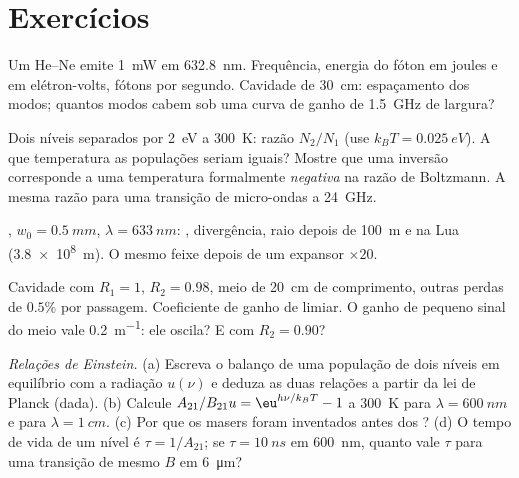 \section{Exercícios}

\begin{exercise}[$\star$]\label{exo:b2:laser:1}
Um  He--Ne emite \qty{1}{mW} em \qty{632.8}{nm}. Frequência, energia
do fóton em joules e em elétron-volts, fótons por segundo. Cavidade de
\qty{30}{cm}: espaçamento dos modos; quantos modos cabem sob uma curva de ganho
de \qty{1.5}{GHz} de largura?
\end{exercise}

\begin{exercise}[$\star$]\label{exo:b2:laser:2}
Dois níveis separados por \qty{2}{eV} a \qty{300}{K}: razão $N_2/N_1$ (use
$k_BT = \qty{0.025}{eV}$). A que temperatura as populações seriam
iguais? Mostre que uma inversão corresponde a uma temperatura formalmente \emph{negativa}
na razão de Boltzmann. A mesma razão para uma transição de micro-ondas
a \qty{24}{GHz}.
\end{exercise}

\begin{exercise}[$\star$]\label{exo:b2:laser:3}
, $w_0 = \qty{0.5}{mm}$, $\lambda = \qty{633}{nm}$: , divergência, raio depois de \qty{100}{m} e na Lua
(\qty{3.8e8}{m}). O mesmo feixe depois de um expansor $\times 20$.
\end{exercise}

\begin{exercise}[$\star$]\label{exo:b2:laser:4}
Cavidade com $R_1 = 1$, $R_2 = 0.98$, meio de \qty{20}{cm} de comprimento, outras
perdas de $0.5\%$ por passagem. Coeficiente de ganho de limiar. O ganho de
pequeno sinal do meio vale \qty{0.2}{m^{-1}}: ele oscila? E com
$R_2 = 0.90$?
\end{exercise}

\begin{exercise}[$\star\star$]\label{exo:b2:laser:5}
\emph{Relações de Einstein.} (a) Escreva o balanço de uma população de
dois níveis em equilíbrio com a radiação $u(\nu)$ e deduza as duas
relações a partir da lei de Planck (dada). (b) Calcule
$A_{21}/B_{21}u = \eu^{h\nu/k_BT} - 1$ a \qty{300}{K} para
$\lambda = \qty{600}{nm}$ e para $\lambda = \qty{1}{cm}$. (c) Por que os
masers foram inventados antes dos ? (d) O tempo de vida de um nível é
$\tau = 1/A_{21}$; se $\tau = \qty{10}{ns}$ em \qty{600}{nm}, quanto vale
$\tau$ para uma transição de mesmo $B$ em \qty{6}{\micro m}?
\end{exercise}

